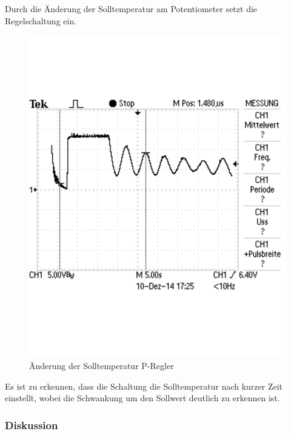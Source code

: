 \documentclass[12pt,a4paper]{article}
\begin{document}
Durch die Änderung der Solltemperatur am Potentiometer setzt die Regelschaltung ein.
\begin{figure}[H]
  \centering
    \includegraphics[trim = 0mm 50mm 0mm 50mm, clip, scale = 0.6]{TEK0006.pdf}
  	\caption[Änderung der Solltemperatur P-Regler]{Änderung der Solltemperatur P-Regler}
  \label{fig:P-Regler_Oszi_3_3_2}
\end{figure}
Es ist zu erkennen, dass die Schaltung die Solltemperatur nach kurzer Zeit einstellt, wobei die Schwankung um den Sollwert deutlich zu erkennen ist.

\subsubsection*{Diskussion}
\end{document}
